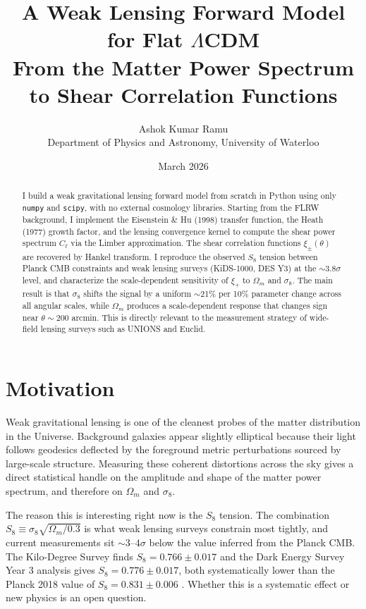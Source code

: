 \documentclass[12pt, a4paper]{article}
\title{\textbf{A Weak Lensing Forward Model for Flat $\Lambda$CDM}\\
\large From the Matter Power Spectrum to Shear Correlation Functions}
\author{Ashok Kumar Ramu\\
\small Department of Physics and Astronomy, University of Waterloo}
\date{March 2026}
\begin{document}
 
\maketitle
 
\begin{abstract}
I build a weak gravitational lensing forward model from scratch in Python using
only \texttt{numpy} and \texttt{scipy}, with no external cosmology libraries.
Starting from the FLRW background, I implement the Eisenstein \& Hu (1998)
transfer function, the Heath (1977) growth factor, and the lensing convergence
kernel to compute the shear power spectrum $C_\ell$ via the Limber approximation.
The shear correlation functions $\xi_\pm(\theta)$ are recovered by Hankel
transform. I reproduce the observed $S_8$ tension between Planck CMB constraints
and weak lensing surveys (KiDS-1000, DES Y3) at the $\sim3.8\sigma$ level, and
characterize the scale-dependent sensitivity of $\xi_+$ to $\Omega_m$ and
$\sigma_8$. The main result is that $\sigma_8$ shifts the signal by a uniform
$\sim$21\% per 10\% parameter change across all angular scales, while $\Omega_m$
produces a scale-dependent response that changes sign near $\theta \sim 200$
arcmin. This is directly relevant to the measurement strategy of wide-field
lensing surveys such as UNIONS and Euclid.
\end{abstract}

\newpage
\tableofcontents
\newpage
 
\section{Motivation}
 
Weak gravitational lensing is one of the cleanest probes of the matter
distribution in the Universe. Background galaxies appear slightly elliptical
because their light follows geodesics deflected by the foreground metric
perturbations sourced by large-scale structure. Measuring these coherent
distortions across the sky gives a direct statistical handle on the amplitude
and shape of the matter power spectrum, and therefore on $\Omega_m$ and
$\sigma_8$.
 
The reason this is interesting right now is the $S_8$ tension.
The combination $S_8 \equiv \sigma_8\sqrt{\Omega_m/0.3}$ is what weak lensing
surveys constrain most tightly, and current measurements sit $\sim3$--$4\sigma$
below the value inferred from the Planck CMB. The Kilo-Degree Survey
\citep{Asgari2021} finds $S_8 = 0.766 \pm 0.017$ and the Dark Energy Survey
Year 3 analysis \citep{Amon2022} gives $S_8 = 0.776 \pm 0.017$, both
systematically lower than the Planck 2018 value of $S_8 = 0.831 \pm 0.006$
\citep{Aghanim2020}. Whether this is a systematic effect or new physics is
an open question.
 
\end{document}
